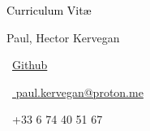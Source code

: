 \begin{scriptsize}
	 \textcolor{black}{Curriculum Vit\ae}
\end{scriptsize}

\vspace*{-0.10em}
\begin{Large} 
	Paul, Hector Kervegan
\end{Large}

\vspace*{0.25em}
%		  
\vspace*{0.4cm}

\begin{footnotesize}
	\begin{tiny}\faHome\end{tiny}~\href{https://github.com/paulhectork/}{Github}
	\quad \begin{tiny}\faEnvelope[regular]\end{tiny}~\href{mailto:paul.kervegan@proton.me}{%
		paul.kervegan@proton.me
	}
	
	\begin{tiny}\faMobile*\end{tiny}~+33 6 74 40 51 67
	
	\quad

\end{footnotesize}